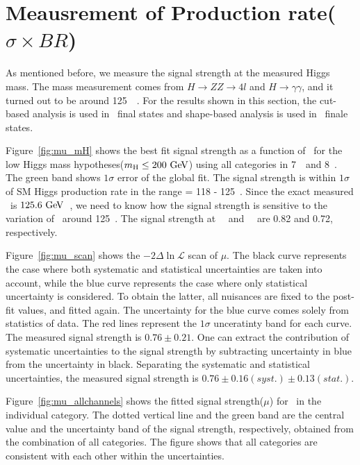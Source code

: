 \section{Meausrement of Production rate($\sigma \times BR$)}

As mentioned before, we measure the signal strength at the 
measured Higgs mass. The mass measurement comes from 
$H\rightarrow ZZ\rightarrow4l$ and $H\rightarrow \gamma\gamma$, 
and it turned out to be around 125~\GeV~\cite{Chatrchyan:1637951, CMS-PAS-HIG-13-001}. 
For the results shown in this section,   
the cut-based analysis is used in \SF\ final states 
and shape-based analysis is used in \DF\ finale states. 

Figure~\ref{fig:mu_mH} shows the best fit signal strength 
as a function of \mHi\ for the low Higgs mass hypotheses($m_{\mathrm{H}}\le200~\mathrm{Ge\kern -0.1em V}$)
using all categories in 7~\TeV\ and 8~\TeV. 
The green band shows $1\sigma$ error of the global fit. 
The signal strength is within $1\sigma$ of SM Higgs production rate 
in the range \mHi = 118 - 125~\GeV. 
Since the exact measured \mHi\ is $125.6~\mathrm{Ge\kern -0.1em V}$~\cite{Chatrchyan:1637951}, 
we need to know how the signal strength is sensitive to the 
variation of \mHi\ around 125~\GeV. 
The signal strength at ~\GeV\ and ~\GeV\ are 0.82 and 0.72, respectively.

Figure~\ref{fig:mu_scan} shows the  $- 2\Delta\ln \mathcal{L}$ scan of $\mu$. 
The black curve represents the case where both systematic and statistical 
uncertainties are taken into account, while the blue curve represents the case 
where only statistical uncertainty is considered. To obtain the latter,  
all nuisances are fixed to the post-fit values, and fitted again.  
The uncertainty for the blue curve comes solely from statistics of data. 
The red lines represent the $1\sigma$ unceratinty band for each curve. 
The measured signal strength is $0.76 \pm 0.21$.  
One can extract the contribution of systematic uncertainties to the signal strength
by subtracting uncertainty in blue from the uncertainty in black.
Separating the systematic and statistical uncertainties, 
the measured signal strength is $0.76 \pm 0.16(syst.) \pm 0.13(stat.)$.  

Figure~\ref{fig:mu_allchannels} shows the fitted signal strength($\mu$) 
for ~\GeV in the individual category. 
The dotted vertical line and the green band are 
the central value and the uncertainty band of the signal strength, respectively, 
obtained from the combination of all categories. 
The figure shows that all categories are consistent with each other
within the uncertainties.

